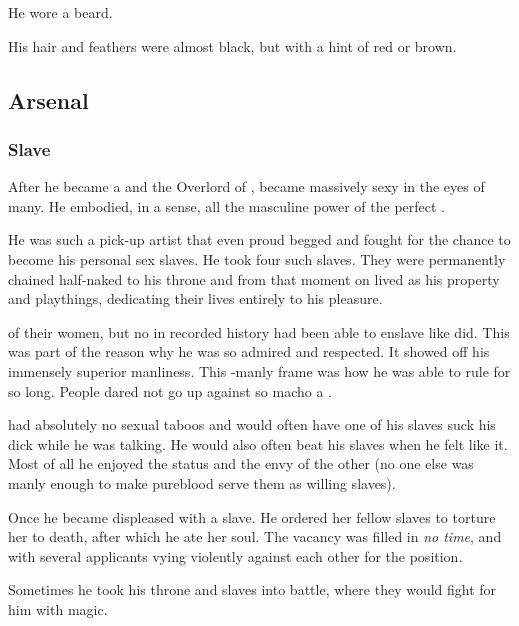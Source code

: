He wore a beard. 

His hair and feathers were almost black, but with a hint of red or brown. 









\subsection{Arsenal}
\subsubsection{Slave \resviel}
After he became a \sathariah{} and the Overlord of \Mystraacht, \Zachirah{} became massively sexy in the eyes of many. 
He embodied, in a sense, all the masculine power of the perfect \resphan. 

He was such a pick-up artist that even proud \resviel{} begged and fought for the chance to become his personal sex slaves. 
He took four such slaves. 
They were permanently chained half-naked to his throne and from that moment on lived as his property and playthings, dedicating their lives entirely to his pleasure. 

 of their women, but no \resphan{} in recorded history had been able to enslave \resviel{} like \Zachirah{} did. 
This was part of the reason why he was so admired and respected. 
It showed off his immensely superior manliness. 
This \uber-manly frame was how he was able to rule \Mystraacht{} for so long. 
People dared not go up against so macho a \resphan. 

\Zachirah{} had absolutely no sexual taboos and would often have one of his slaves suck his dick while he was talking. 
He would also often beat his slaves when he felt like it. 
Most of all he enjoyed the status and the envy of the other \resphain{} (no one else was manly enough to make pureblood \resviel{} serve them as willing slaves). 

Once he became displeased with a slave. 
He ordered her fellow slaves to torture her to death, after which he ate her soul. 
The vacancy was filled in \emph{no time}, and with several applicants vying violently against each other for the position. 

Sometimes he took his throne and slaves into battle, where they would fight for him with magic. 

